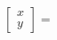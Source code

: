 \documentclass[preview]{standalone}
\begin{document}
\begin{center}
$\begin{bmatrix} x \\ y \end{bmatrix} = $
\end{center}
\end{document}
